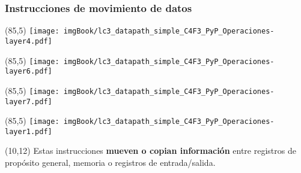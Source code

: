 \documentclass[aspectratio=169]{beamer}
\begin{document}
\begin{frame}[t,fragile]
    \frametitle{Instrucciones de movimiento de datos}
    \begin{textblock}{65}(85,5) \texttt{[image: imgBook/lc3\_datapath\_simple\_C4F3\_PyP\_Operaciones-layer4.pdf]} \end{textblock} %
    \begin{textblock}{65}(85,5) \texttt{[image: imgBook/lc3\_datapath\_simple\_C4F3\_PyP\_Operaciones-layer6.pdf]} \end{textblock} %
    \begin{textblock}{65}(85,5) \texttt{[image: imgBook/lc3\_datapath\_simple\_C4F3\_PyP\_Operaciones-layer7.pdf]} \end{textblock} %
    \begin{textblock}{65}(85,5) \texttt{[image: imgBook/lc3\_datapath\_simple\_C4F3\_PyP\_Operaciones-layer1.pdf]} \end{textblock}
    \begin{textblock}{72}(10,12)
    \small
    Estas instrucciones \textbf{mueven o copian información} entre registros de propósito general, memoria o registros de entrada/salida.\\
    \bigskip
    \bigskip
    \end{textblock}
\end{frame}
\end{document}
